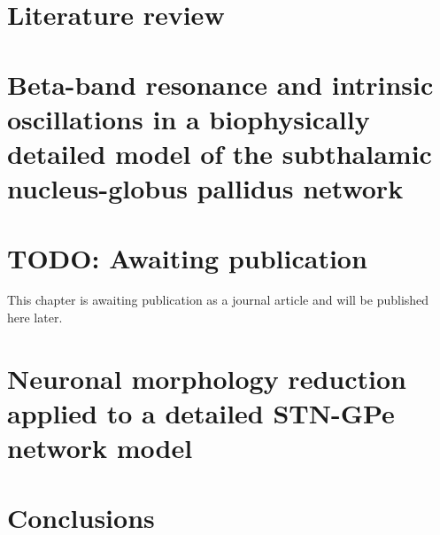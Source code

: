 \documentclass[11pt]{book} %
\begin{document}
\chapter{Literature review}
\label{ch2:lit-review}


\chapter{Beta-band resonance and intrinsic oscillations in a biophysically detailed model of the subthalamic
nucleus-globus pallidus network}
\label{ch3:detailed-model}


\chapter{TODO: Awaiting publication}
% 

This chapter is awaiting publication as a journal article and will be published here later.

\chapter{Neuronal morphology reduction applied to a detailed STN-GPe network model}
\label{ch5:reduced-model}


\chapter{Conclusions}
\label{ch6:conclusions}


\end{document}
